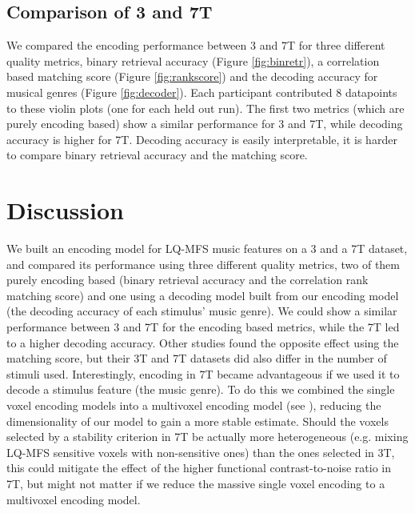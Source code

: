 \subsection*{Comparison of 3 and 7T}
%
%
We compared the encoding performance between 3 and 7T for three different
quality metrics, binary retrieval accuracy (Figure \ref{fig:binretr}), a
correlation based matching score (Figure \ref{fig:rankscore}) and the decoding
accuracy for musical genres (Figure \ref{fig:decoder}). Each participant
contributed 8 datapoints to these violin plots (one for each held out run). The
first two metrics (which are purely encoding based) show a similar performance
for 3 and 7T, while decoding accuracy is higher for 7T. Decoding accuracy is
easily interpretable, it is harder to compare binary retrieval accuracy and the
matching score.     


\section*{Discussion}

We built an encoding model for LQ-MFS music features on a 3 and a 7T dataset,
and compared its performance using three different quality metrics, two of them
purely encoding based (binary retrieval accuracy and the correlation rank
matching score) and one using a decoding model built from our encoding model
(the decoding accuracy of each stimulus' music genre). We could show a similar
performance between 3 and 7T for the encoding based metrics, while the 7T led
to a higher decoding accuracy. Other studies \cite{SF14} found the opposite
effect using the matching score, but their 3T and 7T datasets did also differ
in the number of stimuli used. Interestingly, encoding in 7T became
advantageous if we used it to decode a stimulus feature (the music genre). To
do this we combined the single voxel encoding models into a multivoxel encoding
model (see \cite{NG09}), reducing the dimensionality of our model to gain a
more stable estimate. Should the voxels selected by a stability criterion in 7T
be actually more heterogeneous (e.g. mixing LQ-MFS sensitive voxels with
non-sensitive ones) than the ones selected in 3T, this could mitigate the
effect of the higher functional contrast-to-noise ratio in 7T, but might not
matter if we reduce the massive single voxel encoding to a multivoxel encoding
model.

